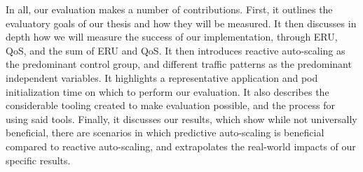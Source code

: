 In all, our evaluation makes a number of contributions. First, it outlines the
evaluatory goals of our thesis and how they will be measured. It then discusses
in depth how we will measure the success of our implementation, through ERU,
QoS, and the sum of ERU and QoS. It then introduces reactive auto-scaling as the
predominant control group, and different traffic patterns as the predominant
independent variables. It highlights a representative application and pod
initialization time on which to perform our evaluation. It also describes the
considerable tooling created to make evaluation possible, and the process for
using said tools. Finally, it discusses our results, which show while not
universally beneficial, there are scenarios in which predictive auto-scaling is
beneficial compared to reactive auto-scaling, and extrapolates the real-world
impacts of our specific results.

